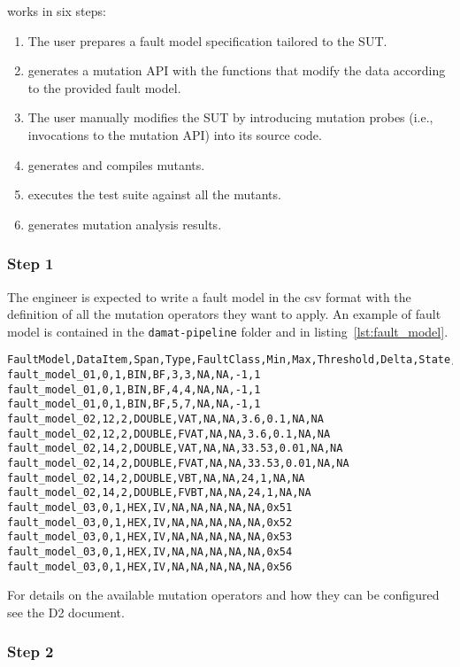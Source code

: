 \DAMA works in six steps:

\begin{enumerate}
	\item The user prepares a fault model specification tailored to the SUT.
	\item \DAMA generates a mutation API with the functions that modify the data according to the provided fault model.
	\item The user manually modifies the SUT by introducing mutation probes (i.e., invocations to the mutation API) into its source code.
	\item \DAMA generates and compiles mutants.
	\item \DAMA executes the test suite against all the mutants.
	\item \DAMA generates mutation analysis results.
\end{enumerate}

\subsubsection{Step 1}
The engineer is expected to write a fault model in the csv format with the definition of all the mutation operators they want to apply.
An example of fault model is contained in the \texttt{damat-pipeline} folder and in listing~\ref{lst:fault_model}.

\begin{lstlisting}[label={lst:fault_model}]
FaultModel,DataItem,Span,Type,FaultClass,Min,Max,Threshold,Delta,State,Value
fault_model_01,0,1,BIN,BF,3,3,NA,NA,-1,1
fault_model_01,0,1,BIN,BF,4,4,NA,NA,-1,1
fault_model_01,0,1,BIN,BF,5,7,NA,NA,-1,1
fault_model_02,12,2,DOUBLE,VAT,NA,NA,3.6,0.1,NA,NA
fault_model_02,12,2,DOUBLE,FVAT,NA,NA,3.6,0.1,NA,NA
fault_model_02,14,2,DOUBLE,VAT,NA,NA,33.53,0.01,NA,NA
fault_model_02,14,2,DOUBLE,FVAT,NA,NA,33.53,0.01,NA,NA
fault_model_02,14,2,DOUBLE,VBT,NA,NA,24,1,NA,NA
fault_model_02,14,2,DOUBLE,FVBT,NA,NA,24,1,NA,NA
fault_model_03,0,1,HEX,IV,NA,NA,NA,NA,NA,0x51
fault_model_03,0,1,HEX,IV,NA,NA,NA,NA,NA,0x52
fault_model_03,0,1,HEX,IV,NA,NA,NA,NA,NA,0x53
fault_model_03,0,1,HEX,IV,NA,NA,NA,NA,NA,0x54
fault_model_03,0,1,HEX,IV,NA,NA,NA,NA,NA,0x56
\end{lstlisting}

For details on the available mutation operators and how they can be configured see the D2 document.

\subsubsection{Step 2}

